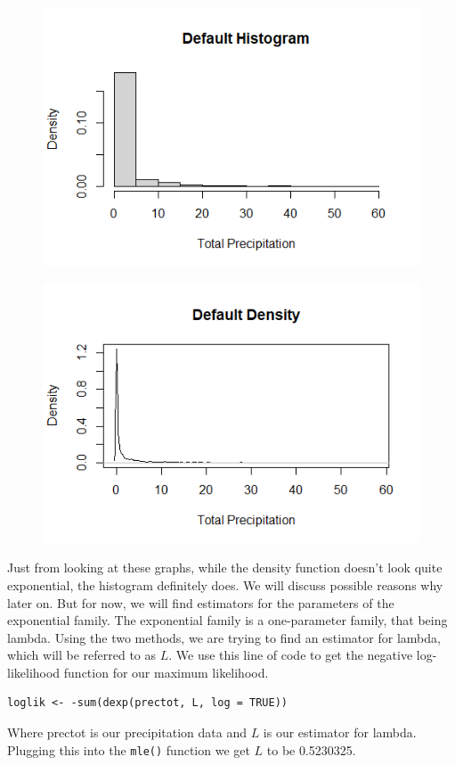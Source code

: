 \documentclass[12pt, a4paper, oneside]{report}
\begin{document}
\begin{figure}[h]
  \centering
  \includegraphics[width=0.7\linewidth]{expHistDefault.png}
\end{figure}

\begin{figure}[h]
  \centering
  \includegraphics[width=0.7\linewidth]{expDensityDefault.png}
\end{figure}

\newpage
Just from looking at these graphs, while the density function doesn’t look quite exponential, the histogram definitely does. We will discuss possible reasons why later on. But for now, we will find estimators for the parameters of the exponential family.
The exponential family is a one-parameter family, that being lambda. Using the two methods, we are trying to find an estimator for lambda, which will be referred to as \(L\).
We use this line of code to get the negative log-likelihood function for our maximum likelihood.

\begin{lstlisting}
loglik <- -sum(dexp(prectot, L, log = TRUE))
\end{lstlisting}

Where prectot is our precipitation data and \(L\) is our estimator for lambda.
Plugging this into the \lstinline{mle()} function we get \(L\) to be 0.5230325.
\end{document}
